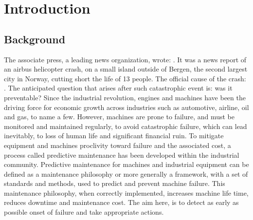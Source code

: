 \documentclass[../Main/thesis.tex]{subfiles}
\begin{document}
\chapter{Introduction}
\label{ch:introduction}

\section{Background}
\label{sec:background}
The associate press, a leading news organization, wrote: .
It was a news report of an airbus helicopter crash, on a small island outside of Bergen, the second largest city in Norway, cutting short the life of 13 people. The official cause of the crash: . The anticipated question that arises after such catastrophic event is: was it preventable?
\justify
Since the industrial revolution, engines and machines have been the driving force for economic growth across industries such as automotive, airline, oil and gas, to name a few. However, machines are prone to failure, and must be monitored and maintained regularly, to avoid catastrophic failure, which can lead inevitably, to loss of human life and significant financial ruin. 
\justify
To mitigate equipment and machines proclivity toward failure and the associated cost, a process called predictive maintenance has been developed within the industrial community. Predictive maintenance  for machines and industrial equipment can be defined as a maintenance philosophy or more generally a framework, with a set of standards and methods, used to predict and prevent machine failure. This maintenance philosophy, when correctly implemented, increases machine life time, reduces downtime and maintenance cost. The aim here, is to detect as early as possible onset of failure and take appropriate actions.
\end{document}
